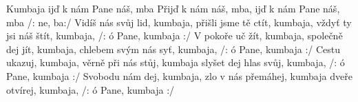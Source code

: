 \begin{TEXT}{Kumbaja}
\SLOKA {}ijď k nám Pane náš, mba \NL
Přijď k nám  náš, mba,  \NL
{}ijď k nám Pane náš, mba \NL
/:  ne, ba:/ 
\SLOKA Vidíš nás svůj lid, kumbaja, \NL
přišli jsme tě ctít, kumbaja, \NL
vždyť ty jsi náš štít, kumbaja, \NL
/: ó Pane, kumbaja :/ 
\SLOKA V pokoře uč žít, kumbaja, \NL
společně dej jít, kumbaja, \NL
chlebem svým nás syť, kumbaja, \NL
/: ó Pane, kumbaja :/ 
\SLOKA Cestu ukazuj, kumbaja, \NL
věrně při nás stůj, kumbaja \NL
slyšet dej hlas svůj, kumbaja, \NL
/: ó Pane, kumbaja :/ 
\SLOKA Svobodu nám dej, kumbaja, \NL
zlo v nás přemáhej, kumbaja \NL
dveře otvírej, kumbaja, \NL
/: ó Pane, kumbaja :/ \NL
\end{TEXT}
